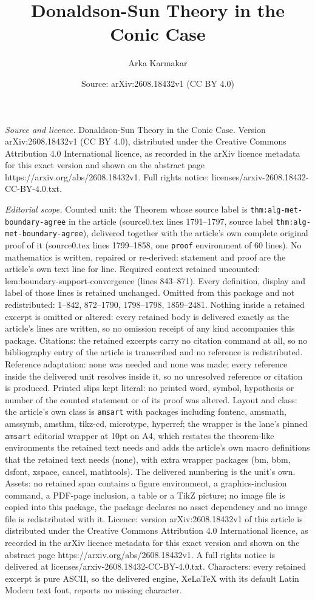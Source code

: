 \documentclass[10pt,a4paper]{amsart}
\title[Donaldson-Sun Theory in the Conic Case]{Donaldson-Sun Theory in the Conic Case}
\author{Arka Karmakar}
\date{Source: arXiv:2608.18432v1 (CC BY 4.0)}
\begin{document}
\maketitle

\noindent\emph{Source and licence.} Donaldson-Sun Theory in the Conic Case. Version arXiv:2608.18432v1 (CC BY 4.0), distributed under the Creative Commons Attribution 4.0 International licence, as recorded in the arXiv licence metadata for this exact version and shown on the abstract page https://arxiv.org/abs/2608.18432v1. Full rights notice: licenses/arxiv-2608.18432-CC-BY-4.0.txt.\par\smallskip

\noindent\textit{Editorial scope.} Counted unit: the Theorem whose source label is \texttt{thm:alg-met-boundary-agree} in the article (source0.tex lines 1791--1797, source label \texttt{thm:alg-met-boundary-agree}), delivered together with the article's own complete original proof of it (source0.tex lines 1799--1858, one \texttt{proof} environment of 60 lines). No mathematics is written, repaired or re-derived: statement and proof are the article's own text line for line. Required context retained uncounted: lem:boundary-support-convergence (lines 843--871). Every definition, display and label of those lines is retained unchanged. Omitted from this package and not redistributed: 1--842, 872--1790, 1798--1798, 1859--2481. Nothing inside a retained excerpt is omitted or altered: every retained body is delivered exactly as the article's lines are written, so no omission receipt of any kind accompanies this package. Citations: the retained excerpts carry no citation command at all, so no bibliography entry of the article is transcribed and no reference is redistributed. Reference adaptation: none was needed and none was made; every reference inside the delivered unit resolves inside it, so no unresolved reference or citation is produced. Printed slips kept literal: no printed word, symbol, hypothesis or number of the counted statement or of its proof was altered. Layout and class: the article's own class is \texttt{amsart} with packages including fontenc, amsmath, amssymb, amsthm, tikz-cd, microtype, hyperref; the wrapper is the lane's pinned \texttt{amsart} editorial wrapper at 10pt on A4, which restates the theorem-like environments the retained text needs and adds the article's own macro definitions that the retained text needs (none), with extra wrapper packages (bm, bbm, dsfont, xspace, cancel, mathtools). The delivered numbering is the unit's own. Assets: no retained span contains a figure environment, a graphics-inclusion command, a PDF-page inclusion, a table or a TikZ picture; no image file is copied into this package, the package declares no asset dependency and no image file is redistributed with it. Licence: version arXiv:2608.18432v1 of this article is distributed under the Creative Commons Attribution 4.0 International licence, as recorded in the arXiv licence metadata for this exact version and shown on the abstract page https://arxiv.org/abs/2608.18432v1. A full rights notice is delivered at licenses/arxiv-2608.18432-CC-BY-4.0.txt. Characters: every retained excerpt is pure ASCII, so the delivered engine, XeLaTeX with its default Latin Modern text font, reports no missing character.
\end{document}
